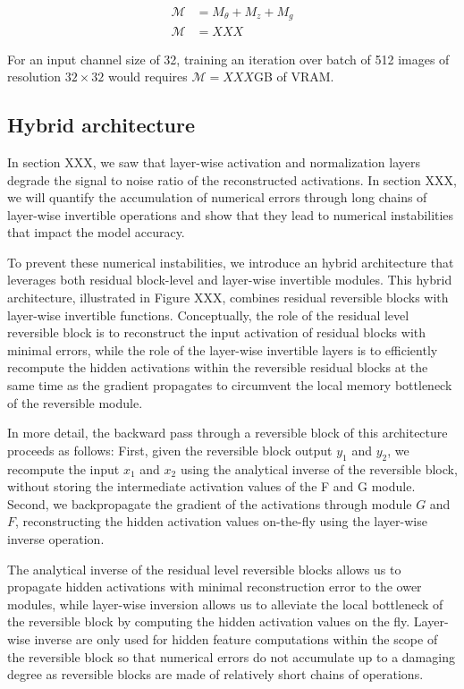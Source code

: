 \documentclass[twocolumn]{bmcart}
\begin{document}
\begin{subequations}
\begin{align}
\mathcal{M} &= M_{\theta} + M_{z} + M_{g} \\
\mathcal{M} &= XXX
\end{align}
\end{subequations}

For an input channel size of 32, training an iteration over batch of 512 images of resolution $32 \times 32$ would requires $\mathcal{M}=XXX$GB of VRAM. 

\subsection{Hybrid architecture}

In section XXX, we saw that layer-wise activation and normalization layers degrade the signal to noise ratio of the reconstructed activations.
In section XXX, we will quantify the accumulation of numerical errors through long chains of layer-wise invertible operations and show that they lead to numerical instabilities that impact the model accuracy.

To prevent these numerical instabilities, we introduce an hybrid architecture that leverages both residual block-level and layer-wise invertible modules.
This hybrid architecture, illustrated in Figure XXX, combines residual reversible blocks with layer-wise invertible functions. 
Conceptually, the role of the residual level reversible block is to reconstruct the input activation of residual blocks with minimal errors, while the role of the layer-wise invertible layers is to efficiently recompute the hidden activations within the reversible residual blocks at the same time as the gradient propagates to circumvent the local memory bottleneck of the reversible module.

In more detail, the backward pass through a reversible block of this architecture proceeds as follows: 
First, given the reversible block output $y_1$ and $y_2$, we recompute the input $x_1$ and $x_2$ using the analytical inverse of the reversible block, without storing the intermediate activation values of the F and G module.
Second, we backpropagate the gradient of the activations through module $G$ and $F$, reconstructing the hidden activation values on-the-fly using the layer-wise inverse operation.

The analytical inverse of the residual level reversible blocks allows us to propagate hidden activations with minimal reconstruction error to the ower modules, while layer-wise inversion allows us to alleviate the local bottleneck of the reversible block by computing the hidden activation values on the fly. Layer-wise inverse are only used for hidden feature computations within the scope of the reversible block so that numerical errors do not accumulate up to a damaging degree as reversible blocks are made of relatively short chains of operations.
\end{document}

